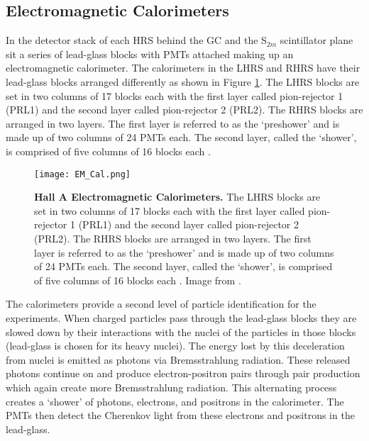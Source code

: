 \subsection{Electromagnetic Calorimeters}
\label{ssec:em_cal}

In the detector stack of each HRS behind the GC and the S$_{2m}$ scintillator plane sit a series of lead-glass blocks with PMTs attached making up an electromagnetic calorimeter. The calorimeters in the LHRS and RHRS have their lead-glass blocks arranged differently as shown in Figure \ref{fig:em_cal}. The LHRS blocks are set in two columns of 17 blocks each with the first layer called pion-rejector 1 (PRL1) and the second layer called pion-rejector 2 (PRL2). The RHRS blocks are arranged in two layers. The first layer is referred to as the `preshower' and is made up of two columns of 24 PMTs each. The second layer, called the `shower', is comprised of five columns of 16 blocks each \cite{Article:HallA} \cite{Thesis:Ye}. 

\begin{figure}[!ht]
\begin{center}
\texttt{[image: EM\_Cal.png]}
\end{center}
\caption[Hall A Electromagnetic Calorimeters]{
{\bf{Hall A Electromagnetic Calorimeters.}} The LHRS blocks are set in two columns of 17 blocks each with the first layer called pion-rejector 1 (PRL1) and the second layer called pion-rejector 2 (PRL2). The RHRS blocks are arranged in two layers. The first layer is referred to as the `preshower' and is made up of two columns of 24 PMTs each. The second layer, called the `shower', is comprised of five columns of 16 blocks each \cite{Article:HallA} \cite{Thesis:Ye}. Image from \cite{Article:HallA}.}
\label{fig:em_cal}
\end{figure}

The calorimeters provide a second level of particle identification for the experiments. When charged particles pass through the lead-glass blocks they are slowed down by their interactions with the nuclei of the particles in those blocks (lead-glass is chosen for its heavy nuclei). The energy lost by this deceleration from nuclei is emitted as photons via Bremsstrahlung radiation. These released photons continue on and produce electron-positron pairs through pair production which again create more Bremsstrahlung radiation. This alternating process creates a `shower' of photons, electrons, and positrons in the calorimeter. The PMTs then detect the Cherenkov light from these electrons and positrons in the lead-glass. 

